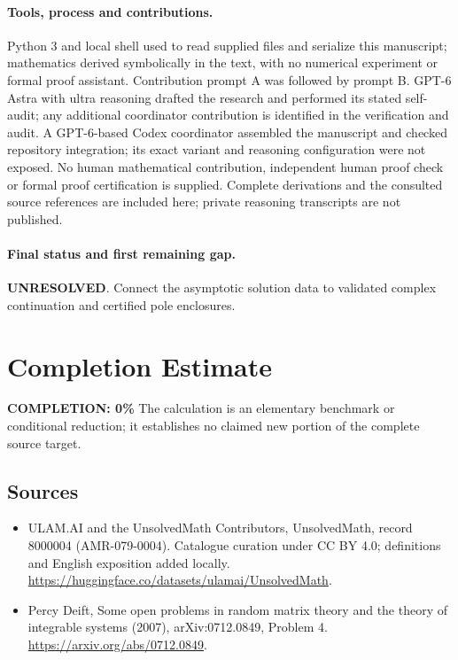 \documentclass[11pt]{article}
\begin{document}
\paragraph{Tools, process and contributions.}
Python 3 and local shell used to read supplied files and serialize this manuscript; mathematics derived symbolically in the text, with no numerical experiment or formal proof assistant. Contribution prompt A was followed by prompt B. GPT-6 Astra with ultra reasoning drafted the research and performed its stated self-audit; any additional coordinator contribution is identified in the verification and audit. A GPT-6-based Codex coordinator assembled the manuscript and checked repository integration; its exact variant and reasoning configuration were not exposed. No human mathematical contribution, independent human proof check or formal proof certification is supplied. Complete derivations and the consulted source references are included here; private reasoning transcripts are not published.

\paragraph{Final status and first remaining gap.}
\textbf{UNRESOLVED}. Connect the asymptotic solution data to validated complex continuation and certified pole enclosures.

\section{Completion Estimate}
\noindent\textbf{COMPLETION: 0\%}
The calculation is an elementary benchmark or conditional reduction; it establishes no claimed new portion of the complete source target.

\subsection{Sources}
\begin{itemize}
\item[\hypertarget{source:8000004:1}{S1}] ULAM.AI and the UnsolvedMath Contributors, UnsolvedMath, record 8000004 (AMR-079-0004). Catalogue curation under CC BY 4.0; definitions and English exposition added locally.
\url{https://huggingface.co/datasets/ulamai/UnsolvedMath}.
\item[\hypertarget{source:8000004:2}{S2}] Percy Deift, Some open problems in random matrix theory and the theory of integrable systems (2007), arXiv:0712.0849, Problem 4.
\url{https://arxiv.org/abs/0712.0849}.
\end{itemize}
\label{end:8000004}
\end{document}

